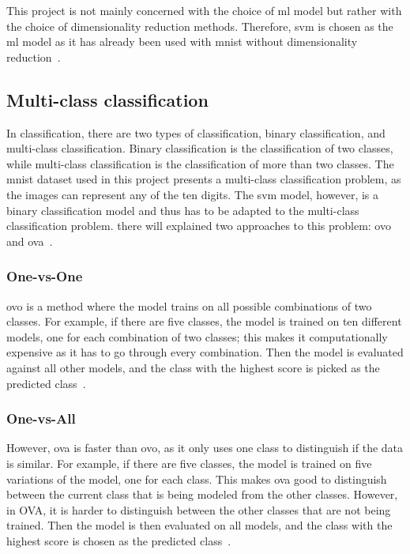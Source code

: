 This project is not mainly concerned with the choice of \gls{ml} model but rather with the choice of dimensionality reduction methods. Therefore, \gls{svm} is chosen as the \gls{ml} model as it has already been used with \gls{mnist} without dimensionality reduction~\cite{lecun-mnist-database}. 


\subsection{Multi-class classification}\label{subsec:multi-class}
In classification, there are two types of classification, binary classification, and multi-class classification. Binary classification is the classification of two classes, while multi-class classification is the classification of more than two classes. The \gls{mnist} dataset used in this project presents a multi-class classification problem, as the images can represent any of the ten digits. The \gls{svm} model, however, is a binary classification model and thus has to be adapted to the multi-class classification problem. there will explained two approaches to this problem: \gls{ovo} and \gls{ova}~\cite{james-statistical-learning1}.

\subsubsection{One-vs-One}\label{subsubsec:one-vs-one}
\gls{ovo} is a method where the model trains on all possible combinations of two classes. For example, if there are five classes, the model is trained on ten different models, one for each combination of two classes; this makes it computationally expensive as it has to go through every combination. Then the model is evaluated against all other models, and the class with the highest score is picked as the predicted class~\cite{james-statistical-learning1}.

\subsubsection{One-vs-All}\label{subsubsec:one-vs-all}
However, \gls{ova} is faster than \gls{ovo}, as it only uses one class to distinguish if the data is similar. For example, if there are five classes, the model is trained on five variations of the model, one for each class. This makes \gls{ova} good to distinguish between the current class that is being modeled from the other classes. However, in OVA, it is harder to distinguish between the other classes that are not being trained. Then the model is then evaluated on all models, and the class with the highest score is chosen as the predicted class~\cite{james-statistical-learning1}.

